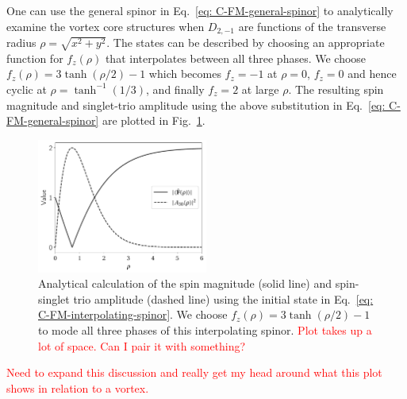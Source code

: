One can use the general spinor in Eq.~\eqref{eq: C-FM-general-spinor} to
analytically examine the vortex core structures when \(D_{2,{-1}}\) are
functions of the transverse radius \(\rho = \sqrt{x^2 + y^2}\).
The states can be described by choosing an appropriate function for
\(f_z(\rho)\) that interpolates between all three phases.
We choose \(f_z(\rho) = 3\tanh(\rho/2) - 1\) which becomes \(f_z=-1\) at
\(\rho=0\), \(f_z=0\) and hence cyclic at \(\rho=\tanh^{-1}(1/3)\), and
finally \(f_z=2\) at large \(\rho \).
The resulting spin magnitude and singlet-trio amplitude using the above
substitution in Eq.~\eqref{eq: C-FM-general-spinor} are plotted in
Fig.~\ref{fig: C-FM-analytical-spin-singlet}.
\begin{figure}
    \centering
    \includegraphics[width=0.5\textwidth]
    {gfx/ch-spin2/spin_singlet_radius_analytical.pdf}
    \caption{\label{fig: C-FM-analytical-spin-singlet}
        Analytical calculation of the spin magnitude (solid line) and
        spin-singlet trio amplitude (dashed line) using the initial state in
        Eq.~\eqref{eq: C-FM-interpolating-spinor}.
        We choose \(f_z(\rho) = 3\tanh(\rho/2) - 1\) to mode all three phases of
        this interpolating spinor.
        \textcolor{red}{Plot takes up a lot of space. Can I pair it with
            something?}
    }
\end{figure}
\textcolor{red}{Need to expand this discussion and really get my head around
    what this plot shows in relation to a vortex.}

